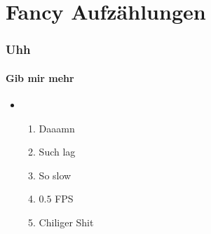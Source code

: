 \section{Fancy Aufzählungen}

\begin{frame}
\frametitle{Uhh}
\framesubtitle{Gib mir mehr}
\begin{itemize}
\item<1->[]{
\begin{enumerate}
\item<1-| alert@1> Daaamn
\item<2-| alert@2> Such lag
\item<3-| alert@3> So slow
\item<4-| alert@4> $0.5$ FPS
\item<5-| alert@5> Chiliger Shit
\end{enumerate}}
\end{itemize}
\end{frame}
